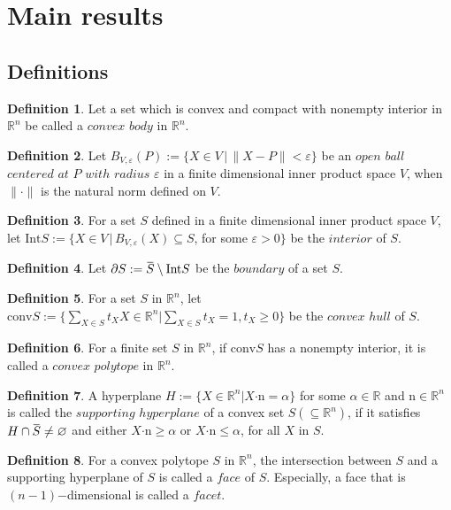 \documentclass[a4paper]{article}
\newcommand{\overbar}[1]{\mkern 1.5mu\overline{\mkern-1.5mu#1\mkern-1.5mu}\mkern 1.5mu}
\theoremstyle{definition}
\newtheorem{defn}{Definition}[subsection]
\begin{document}
\section{Main results}
\subsection{Definitions}
\begin{defn} Let a set which is convex and compact with nonempty interior in $\mathbb{R}^n$ be called a $convex$ $ body$ in $\mathbb{R}^n$.
\end{defn}
\begin{defn} Let $B_{V,\varepsilon} (P):= \{X\in V \,|\, \|X-P \| < \varepsilon\}$ be an $open$ $ball$ $centered$ $at$ $P$ $with$ $radius$ $\varepsilon$ in a finite dimensional inner product space $V$, when $\|\cdot\|$ is the natural norm defined on $V$.
\end{defn}
\begin{defn}For a set $S$ defined in a finite dimensional inner product space $V$,
\newline
let $\mathrm{Int}S := \{X\in V\,|\,B_{V, \varepsilon}(X) \subseteq S$, for some $\varepsilon>0\}$ be the $interior$ of $S$.
\end{defn}
\begin{defn}Let $\partial S:=\overbar{S} \setminus \mathrm{Int}S$ be the $boundary$ of a set $S$.
\end{defn}
\begin{defn} For a set $S$ in $\mathbb{R}^n$, let $\mathrm{conv}S:=\{\sum_{X\in S}t_XX\in\mathbb{R}^n|\sum_{X\in S}t_X=1,t_X\ge0\}$ be the $convex$ $hull$ of $S$.
\end{defn}
\begin{defn}
For a finite set $S$ in $\mathbb{R}^n$, if $\mathrm{conv}S$ has a nonempty interior, it is called a $convex$ $ polytope$ in $\mathbb{R}^n$. 
\end{defn}
\begin{defn} A hyperplane $H:=\{X\in\mathbb{R}^n|X\boldsymbol{\cdot}\boldsymbol{\mathrm{n}}=\alpha\}$ for some $\alpha\in\mathbb{R}$ and $\boldsymbol{\mathrm{n}}\in\mathbb{R}^n$ is called the $supporting$ $hyperplane$ of a convex set $S(\subseteq\mathbb{R}^n)$, if it satisfies $H\cap\overbar{S}\not=\varnothing$ and either $X\boldsymbol{\cdot}\boldsymbol{\mathrm{n}}\ge\alpha$ or $X\boldsymbol{\cdot}\boldsymbol{\mathrm{n}}\le\alpha$, for all $X$ in $S$.
\end{defn}
\begin{defn} For a convex polytope $S$ in $\mathbb{R}^n$, the intersection between $S$ and a supporting hyperplane of $S$ is called a $face$ of $S$. Especially, a face that is $(n-1)$$-$dimensional is called a $facet$.
\end{defn}
\end{document}
